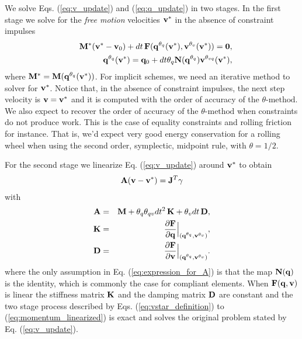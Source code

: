 We solve Eqs. (\ref{eq:v_update}) and (\ref{eq:q_update}) in two stages. In the
first stage we solve for the \textit{free motion} velocities ${\mathbf{v}}^*$ in the
absence of constraint impulses 
\begin{eqnarray}
	&&\mf{M}^*(\mf{v}^*-\mf{v}_0) + dt\,\mf{F}(\mf{q}^{\theta_q}(\mf{v}^*), \mf{v}^{\theta_v}(\mf{v}^*)) = \mf{0},
	\label{eq:vstar_definition}\\
	&&\mf{q}^{\theta_q}(\mf{v}^*) = \mf{q}_0 + dt\theta_q\mf{N}(\mf{q}^{\theta_{q}})\mf{v}^{\theta_{vq}}(\mf{v}^*),
	\label{eq:qstar_definition}
\end{eqnarray}
where ${\mathbf{M}}^* = {\mathbf{M}}({\mathbf{q}}^{\theta_q}({\mathbf{v}}^*))$. For implicit schemes,
we need an iterative method to solver for ${\mathbf{v}}^*$. Notice that, in the
absence of constraint impulses, the next step velocity is ${\mathbf{v}}={\mathbf{v}}^*$ and
it is computed with the order of accuracy of the $\theta\text{-method}$. We also
expect to recover the order of accuracy of the $\theta\text{-method}$ when
constraints do not produce work. This is the case of equality constraints and
rolling friction for instance. That is, we'd expect very good energy
conservation for a rolling wheel when using the second order, symplectic,
midpoint rule, with $\theta=1/2$.

For the second stage we linearize Eq. (\ref{eq:v_update})
around ${\mathbf{v}}^*$ to obtain
\begin{eqnarray}
	\mf{A}(\mf{v}-\mf{v}^*)= \mf{J}^T\mf{\gamma}
	\label{eq:momentum_linearized}
\end{eqnarray}
with
\begin{eqnarray}
	\mf{A}&=&\mf{M}+\theta_q\theta_{qv} dt^2\,\mf{K}+\theta_v dt\,\mf{D},
	\label{eq:expression_for_A}\\
	\mf{K}&=&\frac{\partial \mf{F}}{\partial \mf{q}}\Bigr|_{(\mf{q}^{\theta_q}, \mf{v}^{\theta_v})},\\
	\mf{D}&=&\frac{\partial \mf{F}}{\partial \mf{v}}\Bigr|_{(\mf{q}^{\theta_q},
	\mf{v}^{\theta_v})}.
	\label{eq:dissipation_matrix}
\end{eqnarray}
where the only assumption in Eq. (\ref{eq:expression_for_A}) is that the map
${\mathbf{N}}({\mathbf{q}})$ is the identity, which is commonly the case for compliant
elements. When ${\mathbf{F}}({\mathbf{q}}, {\mathbf{v}})$ is linear the stiffness matrix ${\mathbf{K}}$ and the
damping matrix ${\mathbf{D}}$ are constant and the two stage process described by Eqs.
(\ref{eq:vstar_definition}) to (\ref{eq:momentum_linearized}) is exact and
solves the original problem stated by Eq. (\ref{eq:v_update}).



